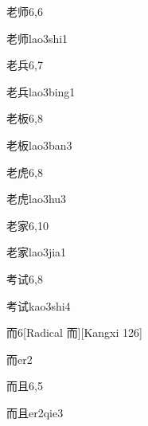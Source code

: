 \begin{entry}{老师}{6,6}
  \begin{phonetics}{老师}{lao3shi1}
  \end{phonetics}
\end{entry}

\begin{entry}{老兵}{6,7}
  \begin{phonetics}{老兵}{lao3bing1}
  \end{phonetics}
\end{entry}

\begin{entry}{老板}{6,8}
  \begin{phonetics}{老板}{lao3ban3}
  \end{phonetics}
\end{entry}

\begin{entry}{老虎}{6,8}
  \begin{phonetics}{老虎}{lao3hu3}
  \end{phonetics}
\end{entry}

\begin{entry}{老家}{6,10}
  \begin{phonetics}{老家}{lao3jia1}
  \end{phonetics}
\end{entry}

\begin{entry}{考试}{6,8}
  \begin{phonetics}{考试}{kao3shi4}
  \end{phonetics}
\end{entry}

\begin{entry}{而}{6}[Radical ⽽][Kangxi 126]
  \begin{phonetics}{而}{er2}
  \end{phonetics}
\end{entry}

\begin{entry}{而且}{6,5}
  \begin{phonetics}{而且}{er2qie3}
  \end{phonetics}
\end{entry}

